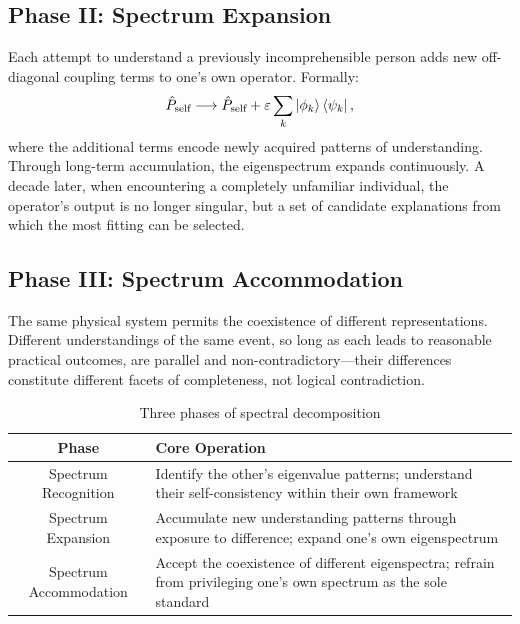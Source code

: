 ﻿\documentclass[11pt,a4paper]{article}
\begin{document}
\subsection*{Phase II: Spectrum Expansion}

Each attempt to understand a previously incomprehensible person adds new off-diagonal coupling terms to one's own operator. Formally:
\begin{equation}
\hat{P}_{\text{self}} \longrightarrow \hat{P}_{\text{self}} + \varepsilon \sum_{k} \ket{\phi_k}\bra{\psi_k},
\label{eq:expansion}
\end{equation}
where the additional terms encode newly acquired patterns of understanding. Through long-term accumulation, the eigenspectrum expands continuously. A decade later, when encountering a completely unfamiliar individual, the operator's output is no longer singular, but a set of candidate explanations from which the most fitting can be selected.

\subsection*{Phase III: Spectrum Accommodation}

The same physical system permits the coexistence of different representations. Different understandings of the same event, so long as each leads to reasonable practical outcomes, are parallel and non-contradictory---their differences constitute different facets of completeness, not logical contradiction.

\begin{table}[h]
\centering
\caption{Three phases of spectral decomposition}
\begin{tabularx}{\textwidth}{cX}
\toprule
\textbf{Phase} & \textbf{Core Operation} \\
\midrule
Spectrum Recognition & Identify the other's eigenvalue patterns; understand their self-consistency within their own framework \\
Spectrum Expansion & Accumulate new understanding patterns through exposure to difference; expand one's own eigenspectrum \\
Spectrum Accommodation & Accept the coexistence of different eigenspectra; refrain from privileging one's own spectrum as the sole standard \\
\bottomrule
\end{tabularx}
\label{tab:phases}
\end{table}

\end{document}
